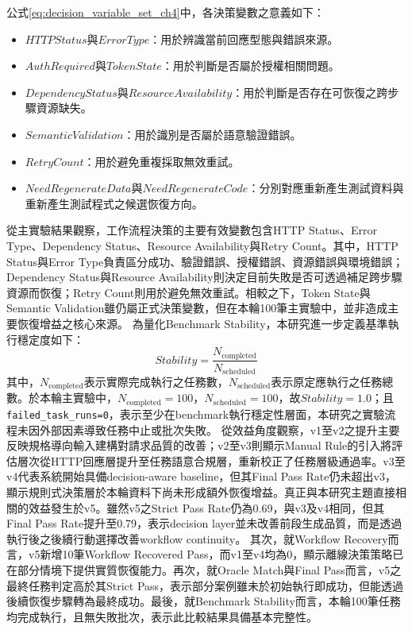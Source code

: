 \begin{ZhChapter}
\text 公式\eqref{eq:decision_variable_set_ch4}中，各決策變數之意義如下：
\begin{itemize}
    \item $HTTPStatus$與$ErrorType$：用於辨識當前回應型態與錯誤來源。
    \item $AuthRequired$與$TokenState$：用於判斷是否屬於授權相關問題。
    \item $DependencyStatus$與$ResourceAvailability$：用於判斷是否存在可恢復之跨步驟資源缺失。
    \item $SemanticValidation$：用於識別是否屬於語意驗證錯誤。
    \item $RetryCount$：用於避免重複採取無效重試。
    \item $NeedRegenerateData$與$NeedRegenerateCode$：分別對應重新產生測試資料與重新產生測試程式之候選恢復方向。
\end{itemize}
\text 從主實驗結果觀察，工作流程決策的主要有效變數包含HTTP Status、Error Type、Dependency Status、Resource Availability與Retry Count。其中，HTTP Status與Error Type負責區分成功、驗證錯誤、授權錯誤、資源錯誤與環境錯誤；Dependency Status與Resource Availability則決定目前失敗是否可透過補足跨步驟資源而恢復；Retry Count則用於避免無效重試。相較之下，Token State與Semantic Validation雖仍屬正式決策變數，但在本輪100筆主實驗中，並非造成主要恢復增益之核心來源。
\text 為量化Benchmark Stability，本研究進一步定義基準執行穩定度如下：
\begin{equation}
\label{eq:benchmark_stability_ch4}
Stability=
\frac{N_{\mathrm{completed}}}
{N_{\mathrm{scheduled}}}
\end{equation}
\text 其中，$N_{\mathrm{completed}}$表示實際完成執行之任務數，$N_{\mathrm{scheduled}}$表示原定應執行之任務總數。於本輪主實驗中，$N_{\mathrm{completed}}=100$，$N_{\mathrm{scheduled}}=100$，故$Stability=1.0$；且\texttt{failed\_task\_runs=0}，表示至少在benchmark執行穩定性層面，本研究之實驗流程未因外部因素導致任務中止或批次失敗。
\text 從效益角度觀察，v1至v2之提升主要反映規格導向輸入建構對請求品質的改善；v2至v3則顯示Manual Rule的引入將評估層次從HTTP回應層提升至任務語意合規層，重新校正了任務層級通過率。v3至v4代表系統開始具備decision-aware baseline，但其Final Pass Rate仍未超出v3，顯示規則式決策層於本輪資料下尚未形成額外恢復增益。真正與本研究主題直接相關的效益發生於v5。雖然v5之Strict Pass Rate仍為0.69，與v3及v4相同，但其Final Pass Rate提升至0.79，表示decision layer並未改善前段生成品質，而是透過執行後之後續行動選擇改善workflow continuity。
\text 其次，就Workflow Recovery而言，v5新增10筆Workflow Recovered Pass，而v1至v4均為0，顯示離線決策策略已在部分情境下提供實質恢復能力。再次，就Oracle Match與Final Pass而言，v5之最終任務判定高於其Strict Pass，表示部分案例雖未於初始執行即成功，但能透過後續恢復步驟轉為最終成功。最後，就Benchmark Stability而言，本輪100筆任務均完成執行，且無失敗批次，表示此比較結果具備基本完整性。


\end{ZhChapter}

